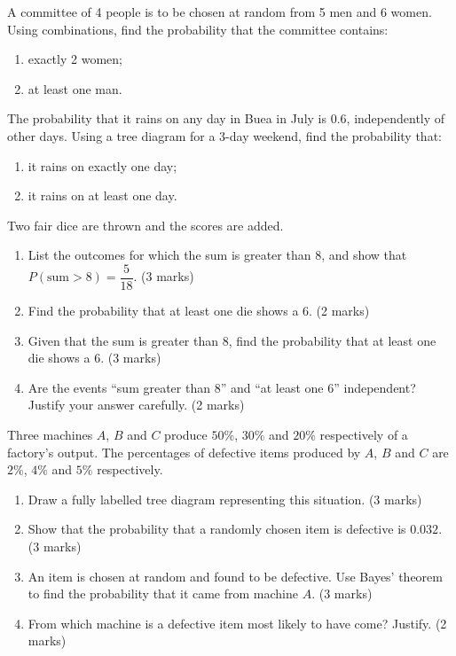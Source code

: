 \documentclass[11pt]{article}
\newcounter{popsec}
\newcounter{popsub}
\newcommand{\courssub}[1]{%
  \stepcounter{popsub}%
  \par\vspace{9pt}\noindent{\popxbold\fontsize{11.5}{13}\selectfont\color{popink}{\color{poporange}\thepopsec.\thepopsub}\hspace{6pt}#1}\par\nopagebreak\vspace{4pt}
}
\begin{document}
\begin{exercice}
A committee of 4 people is to be chosen at random from 5 men and 6 women. Using combinations, find the probability that the committee contains:
\begin{enumerate}
\item exactly 2 women;
\item at least one man.
\end{enumerate}
\end{exercice}

\begin{exercice}
The probability that it rains on any day in Buea in July is $0.6$, independently of other days. Using a tree diagram for a 3-day weekend, find the probability that:
\begin{enumerate}
\item it rains on exactly one day;
\item it rains on at least one day.
\end{enumerate}
\end{exercice}

\courssub{I prepare for the GCE}

\begin{exercice}
Two fair dice are thrown and the scores are added.
\begin{enumerate}
\item List the outcomes for which the sum is greater than 8, and show that $P(\text{sum}>8)=\dfrac{5}{18}$. \hfill (3 marks)
\item Find the probability that at least one die shows a 6. \hfill (2 marks)
\item Given that the sum is greater than 8, find the probability that at least one die shows a 6. \hfill (3 marks)
\item Are the events ``sum greater than 8'' and ``at least one 6'' independent? Justify your answer carefully. \hfill (2 marks)
\end{enumerate}
\end{exercice}

\begin{exercice}
Three machines $A$, $B$ and $C$ produce $50\%$, $30\%$ and $20\%$ respectively of a factory's output. The percentages of defective items produced by $A$, $B$ and $C$ are $2\%$, $4\%$ and $5\%$ respectively.
\begin{enumerate}
\item Draw a fully labelled tree diagram representing this situation. \hfill (3 marks)
\item Show that the probability that a randomly chosen item is defective is $0.032$. \hfill (3 marks)
\item An item is chosen at random and found to be defective. Use Bayes' theorem to find the probability that it came from machine $A$. \hfill (3 marks)
\item From which machine is a defective item most likely to have come? Justify. \hfill (2 marks)
\end{enumerate}
\end{exercice}
\end{document}
